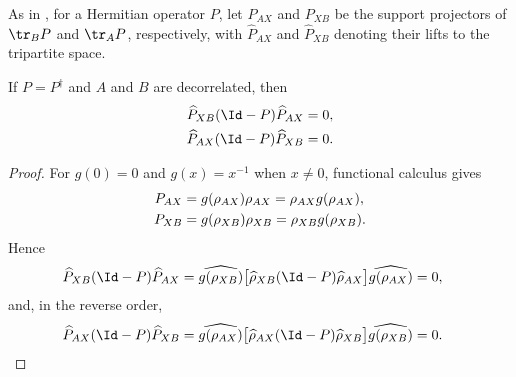 \begin{definition}
    \label{def:tripartite_marginal_supports}
    \leanok
    As in \cite[Appendix~D.2, lines 2225--2229]{Cirac2016MPDO_arXiv}, for a
    Hermitian operator $P$, let $P_{AX}$ and $P_{XB}$ be the support
    projectors of $\tr_B P$ and $\tr_A P$, respectively, with
    $\widehat P_{AX}$ and $\widehat P_{XB}$ denoting their lifts to the
    tripartite space.
\end{definition}

\begin{lemma}
    \label{thm:tripartite_complementary_product_zero}
    \leanok
    If $P=P^\dagger$ and $A$ and $B$ are decorrelated, then
    \begin{align}
        \widehat P_{XB}(\Id-P)\widehat P_{AX}
         & =0,
        \label{eq:parent_support_complementary_zero} \\
        \widehat P_{AX}(\Id-P)\widehat P_{XB}
         & =0.
        \label{eq:parent_reverse_support_complementary_zero}
    \end{align}
\end{lemma}

\begin{proof}
    \leanok
    For $g(0)=0$ and $g(x)=x^{-1}$ when $x\ne0$, functional calculus gives
    \begin{align}
        P_{AX}
         & =g(\rho_{AX})\rho_{AX} =\rho_{AX}g(\rho_{AX}),
        \notag                                            \\
        P_{XB}
         & =g(\rho_{XB})\rho_{XB} =\rho_{XB}g(\rho_{XB}).
        \notag
    \end{align}
    Hence
    \begin{align}
        \widehat P_{XB}(\Id-P)\widehat P_{AX}
         & =\widehat{g(\rho_{XB})}
        \bigl[
            \widehat\rho_{XB}(\Id-P)\widehat\rho_{AX}
            \bigr]
        \widehat{g(\rho_{AX})} =0,
        \notag
    \end{align}
    and, in the reverse order,
    \begin{align}
        \widehat P_{AX}(\Id-P)\widehat P_{XB}
         & =\widehat{g(\rho_{AX})}
        \bigl[
            \widehat\rho_{AX}(\Id-P)\widehat\rho_{XB}
            \bigr]
        \widehat{g(\rho_{XB})} =0.
        \notag
    \end{align}
\end{proof}


